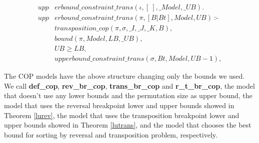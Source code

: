 \begin{align}
  \label{ub_constaint_tra}
  \textit{upp}&\textit{erbound\_constraint\_trans}(\iota, [~], \_Model, \_UB). \nonumber\\
  \textit{upp}&\textit{erbound\_constraint\_trans}(\pi, [B|Bt], Model, UB)~\text{:-} \nonumber\\
  &\textit{transposition\_cop}(\pi, \sigma, \_I, \_J, \_K, B), \\
  &\textit{bound}(\pi, Model, LB, \_UB), \nonumber\\
  &UB \ge LB, \nonumber \\
  &\textit{upperbound\_constraint\_trans}(\sigma, Bt, Model, UB - 1), \nonumber 
\end{align}

The COP models have the above structure changing only the bounds we
used. We call \textbf{def\_cop}, \textbf{rev\_br\_cop},
\textbf{trans\_br\_cop} and \textbf{r\_t\_br\_cop}, the model
that doesn't use any lower bounds and the permutation size as upper
bound, the model that uses the reversal breakpoint lower and upper
bounds showed in Theorem \ref{lurev}, the model that uses the
transposition breakpoint lower and upper bounds showed in Theorem
\ref{lutrans}, and the model that chooses the best bound for sorting
by reversal and transposition problem, respectively.
